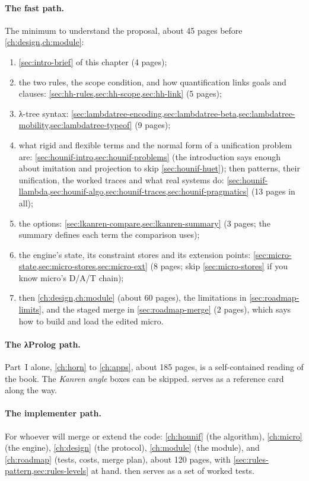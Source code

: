 \paragraph{The fast path.} The minimum to understand the proposal, about 45 pages before
\cref{ch:design,ch:module}:
\begin{enumerate}[nosep]
  \item \cref{sec:intro-brief} of this chapter (4 pages);
  \item the two rules, the scope condition, and how quantification links goals and clauses:
        \cref{sec:hh-rules,sec:hh-scope,sec:hh-link} (5 pages);
  \item λ-tree syntax:
        \cref{sec:lambdatree-encoding,sec:lambdatree-beta,sec:lambdatree-mobility,sec:lambdatree-typeof}
        (9 pages);
  \item what rigid and flexible terms and the normal form of a unification problem are:
        \cref{sec:hounif-intro,sec:hounif-problems} (the introduction says enough about imitation and
        projection to skip \cref{sec:hounif-huet}); then patterns, their unification, the worked traces
        and what real systems do: \cref{sec:hounif-llambda,sec:hounif-algo,sec:hounif-traces,sec:hounif-pragmatics}
        (13 pages in all);
  \item the options: \cref{sec:lkanren-compare,sec:lkanren-summary} (3 pages; the summary defines each
        term the comparison uses);
  \item the engine's state, its constraint stores and its extension points:
        \cref{sec:micro-state,sec:micro-stores,sec:micro-ext} (8 pages; skip \cref{sec:micro-stores} if you
        know micro's D/A/T chain);
  \item then \cref{ch:design,ch:module} (about 60 pages), the limitations in \cref{sec:roadmap-limits},
        and the staged merge in \cref{sec:roadmap-merge} (2 pages), which says how to build and load
        the edited micro.
\end{enumerate}

\paragraph{The λProlog path.} Part~I alone, \cref{ch:horn} to \cref{ch:apps}, about 185 pages, is a
self-contained reading of the book. The \emph{Kanren angle} boxes can be skipped.  serves as
a reference card along the way.

\paragraph{The implementer path.} For whoever will merge or extend the code:
\cref{ch:hounif} (the algorithm), \cref{ch:micro} (the engine), \cref{ch:design} (the protocol),
\cref{ch:module} (the module), and \cref{ch:roadmap} (tests, costs, merge plan), about 120 pages, with
\cref{sec:rules-pattern,sec:rules-levels} at hand.  then serves as a set of worked tests.

